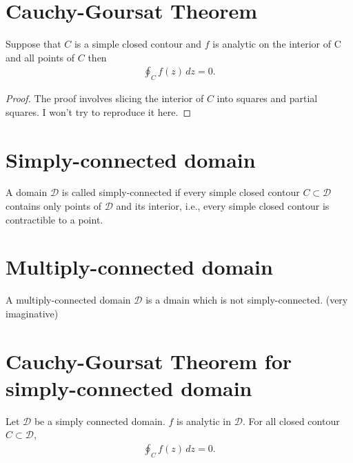 \documentclass{article}
\theoremstyle{definition}
\begin{document}
\section{Cauchy-Goursat Theorem}


Suppose that $C$ is a simple closed contour and $f$ is analytic on the interior of C and all points of $C$ then 
\begin{align}
\oint_C f(z)\,dz  =0.
\end{align}

\begin{proof}
	The proof involves slicing the interior of $C$ into squares and partial squares. I won't try to reproduce it here. 
\end{proof}



\section{Simply-connected domain}

A domain $\mathcal{D}$ is called simply-connected if every simple closed contour $C \subset \mathcal{D}$  contains only points of $\mathcal{D}$ and its interior, i.e., every simple closed contour is contractible to a point.

\section{Multiply-connected domain}

A multiply-connected domain $\mathcal{D}$ is a dmain which is not simply-connected. (very imaginative)



\section{Cauchy-Goursat Theorem for simply-connected domain}

Let $\mathcal{D}$ be a simply connected domain. $f$ is analytic in $\mathcal{D}$. For all closed contour $C \subset \mathcal{D}$,
\begin{align}
\oint_C f(z)\,dz = 0.
\end{align}
\end{document}
